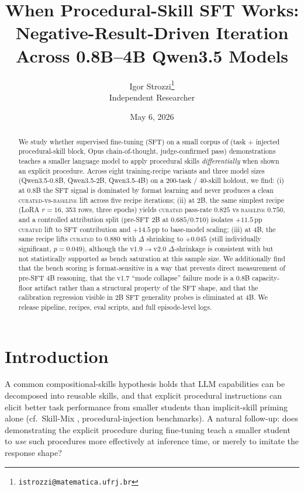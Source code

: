 \documentclass[10pt]{article}
\title{\Large\bfseries When Procedural-Skill SFT Works:\\
  Negative-Result-Driven Iteration Across 0.8B--4B Qwen3.5 Models}
\author{Igor Strozzi\thanks{\texttt{istrozzi@matematica.ufrj.br}}\\
  Independent Researcher}
\date{May 6, 2026}
\newcommand{\BL}{\textsc{baseline}\xspace}
\newcommand{\CU}{\textsc{curated}\xspace}
\newcommand{\Qweno}{Qwen3.5-0.8B\xspace}
\newcommand{\Qwent}{Qwen3.5-2B\xspace}
\newcommand{\Qwenf}{Qwen3.5-4B\xspace}
\begin{document}
\maketitle

\begin{abstract}
We study whether supervised fine-tuning (SFT) on a small corpus of (task + injected procedural-skill block, Opus chain-of-thought, judge-confirmed pass) demonstrations teaches a smaller language model to apply procedural skills \emph{differentially} when shown an explicit procedure. Across eight training-recipe variants and three model sizes (\Qweno, \Qwent, \Qwenf) on a 200-task / 40-skill holdout, we find: (i) at 0.8B the SFT signal is dominated by format learning and never produces a clean \CU-vs-\BL{} lift across five recipe iterations; (ii) at 2B, the same simplest recipe (LoRA $r{=}16$, 353 rows, three epochs) yields \CU{} pass-rate $0.825$ vs \BL{} $0.750$, and a controlled attribution split (pre-SFT 2B at $0.685/0.710$) isolates $+11.5$\,pp \CU{} lift to SFT contribution and $+14.5$\,pp to base-model scaling; (iii) at 4B, the same recipe lifts \CU{} to $0.880$ with $\Delta$ shrinking to $+0.045$ (still individually significant, $p{=}0.049$), although the v1.9$\to$v2.0 $\Delta$-shrinkage is consistent with but not statistically supported as bench saturation at this sample size. We additionally find that the bench scoring is format-sensitive in a way that prevents direct measurement of pre-SFT 4B reasoning, that the v1.7 ``mode collapse'' failure mode is a 0.8B capacity-floor artifact rather than a structural property of the SFT shape, and that the calibration regression visible in 2B SFT generality probes is eliminated at 4B. We release pipeline, recipes, eval scripts, and full episode-level logs.
\end{abstract}

\section{Introduction}

A common compositional-skills hypothesis holds that LLM capabilities can be decomposed into reusable skills, and that explicit procedural instructions can elicit better task performance from smaller students than implicit-skill priming alone (cf.\ Skill-Mix \citep{yu2024skillmix}, procedural-injection benchmarks). A natural follow-up: does demonstrating the explicit procedure during fine-tuning teach a smaller student to \emph{use} such procedures more effectively at inference time, or merely to imitate the response shape?
\end{document}
